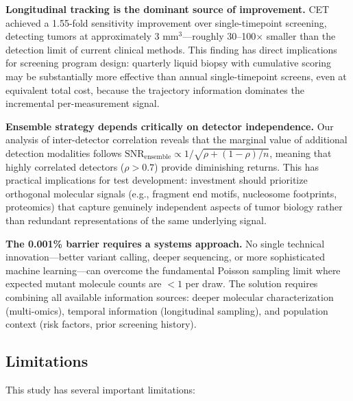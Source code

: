 \documentclass[10pt,a4paper]{article}
\begin{document}
\textbf{Longitudinal tracking is the dominant source of improvement.} CET achieved a 1.55-fold sensitivity improvement over single-timepoint screening, detecting tumors at approximately 3 mm$^3$—roughly 30--100$\times$ smaller than the detection limit of current clinical methods. This finding has direct implications for screening program design: quarterly liquid biopsy with cumulative scoring may be substantially more effective than annual single-timepoint screens, even at equivalent total cost, because the trajectory information dominates the incremental per-measurement signal.

\textbf{Ensemble strategy depends critically on detector independence.} Our analysis of inter-detector correlation reveals that the marginal value of additional detection modalities follows $\text{SNR}_{\text{ensemble}} \propto 1/\sqrt{\rho + (1-\rho)/n}$, meaning that highly correlated detectors ($\rho > 0.7$) provide diminishing returns. This has practical implications for test development: investment should prioritize orthogonal molecular signals (e.g., fragment end motifs, nucleosome footprints, proteomics) that capture genuinely independent aspects of tumor biology rather than redundant representations of the same underlying signal.

\textbf{The 0.001\% barrier requires a systems approach.} No single technical innovation—better variant calling, deeper sequencing, or more sophisticated machine learning—can overcome the fundamental Poisson sampling limit where expected mutant molecule counts are $<1$ per draw. The solution requires combining all available information sources: deeper molecular characterization (multi-omics), temporal information (longitudinal sampling), and population context (risk factors, prior screening history).

\subsection{Limitations}

This study has several important limitations:
\end{document}
